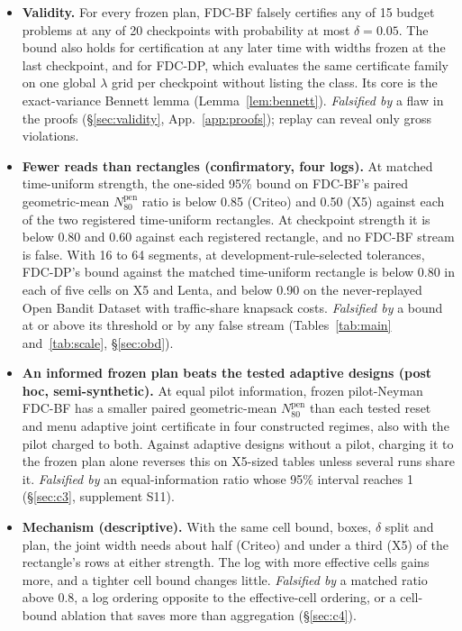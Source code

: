 \documentclass[sigconf,anonymous,review]{acmart}
\newcommand{\Npen}{N_{80}^{\text{pen}}}
\begin{document}
\begin{itemize}
\item[\textbf{C1}] \textbf{Validity.} For every frozen plan, FDC-BF falsely certifies any of 15 budget problems at any of 20 checkpoints with probability at most $\delta = 0.05$. The bound also holds for certification at any later time with widths frozen at the last checkpoint, and for FDC-DP, which evaluates the same certificate family on one global $\lambda$ grid per checkpoint without listing the class. Its core is the exact-variance Bennett lemma (Lemma~\ref{lem:bennett}). \emph{Falsified by} a flaw in the proofs (\S\ref{sec:validity}, App.~\ref{app:proofs}); replay can reveal only gross violations.
\item[\textbf{C2}] \textbf{Fewer reads than rectangles (confirmatory, four logs).} At matched time-uniform strength, the one-sided 95\% bound on FDC-BF's paired geometric-mean $\Npen$ ratio is below 0.85 (Criteo) and 0.50 (X5) against each of the two registered time-uniform rectangles. At checkpoint strength it is below 0.80 and 0.60 against each registered rectangle, and no FDC-BF stream is false. With 16 to 64 segments, at development-rule-selected tolerances, FDC-DP's bound against the matched time-uniform rectangle is below 0.80 in each of five cells on X5 and Lenta, and below 0.90 on the never-replayed Open Bandit Dataset with traffic-share knapsack costs. \emph{Falsified by} a bound at or above its threshold or by any false stream (Tables~\ref{tab:main} and~\ref{tab:scale}, \S\ref{sec:obd}).
\item[\textbf{C3}] \textbf{An informed frozen plan beats the tested adaptive designs (post hoc, semi-synthetic).} At equal pilot information, frozen pilot-Neyman FDC-BF has a smaller paired geometric-mean $\Npen$ than each tested reset and menu adaptive joint certificate in four constructed regimes, also with the pilot charged to both. Against adaptive designs without a pilot, charging it to the frozen plan alone reverses this on X5-sized tables unless several runs share it. \emph{Falsified by} an equal-information ratio whose 95\% interval reaches 1 (\S\ref{sec:c3}, supplement S11).
\item[\textbf{C4}] \textbf{Mechanism (descriptive).} With the same cell bound, boxes, $\delta$ split and plan, the joint width needs about half (Criteo) and under a third (X5) of the rectangle's rows at either strength. The log with more effective cells gains more, and a tighter cell bound changes little. \emph{Falsified by} a matched ratio above 0.8, a log ordering opposite to the effective-cell ordering, or a cell-bound ablation that saves more than aggregation (\S\ref{sec:c4}).
\end{itemize}
\end{document}
